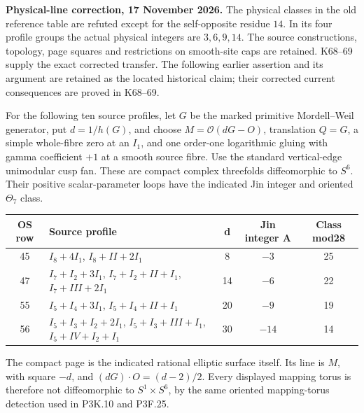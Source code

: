 \begin{theorem}\label{night:P3K.22}
\par\noindent\textbf{Physical-line correction, 17 November 2026.} The physical classes in the old reference table are refuted except for the self-opposite residue \(14\). In its four profile groups the actual physical integers are \(3,6,9,14\). The source constructions, topology, page squares and restrictions on smooth-site caps are retained. K68--69 supply the exact corrected transfer. The following earlier assertion and its argument are retained as the located historical claim; their corrected current consequences are proved in K68--69.\medskip\par 
For the following ten source profiles, let \(G\) be the marked
primitive Mordell--Weil generator, put \(d=1/h(G)\), and choose
\(M=\mathcal O(dG-O)\), translation \(Q=G\), a simple whole-fibre
zero at an \(I_1\), and one order-one logarithmic gluing with gamma
coefficient \(+1\) at a smooth source fibre.  Use the standard
vertical-edge unimodular cusp fan.  These are compact complex
threefolds diffeomorphic to \(S^6\).  Their positive scalar-parameter
loops have the indicated Jin integer and oriented \(\Theta_7\) class.


\begin{center}\small\begin{tabular}{c p{} c c c}\hline
OS row & Source profile & d & Jin integer A & Class mod28 \\
\hline
45 & \(I_8+4I_1\), \(I_8+II+2I_1\) & 8 & \(-3\) & 25 \\
47 & \(I_7+I_2+3I_1\), \(I_7+I_2+II+I_1\), \(I_7+III+2I_1\) & 14 & \(-6\) & 22 \\
55 & \(I_5+I_4+3I_1\), \(I_5+I_4+II+I_1\) & 20 & \(-9\) & 19 \\
56 & \(I_5+I_3+I_2+2I_1\), \(I_5+I_3+III+I_1\), \(I_5+IV+I_2+I_1\) & 30 & \(-14\) & 14 \\
\hline\end{tabular}\end{center}

The compact page is the indicated rational elliptic surface itself.
Its line is \(M\), with square \(-d\), and
\((dG)\cdot O=(d-2)/2\).  Every displayed mapping torus is therefore
not diffeomorphic to \(S^1\times S^6\), by the same oriented
mapping-torus detection used in P3K.10 and P3F.25.


\end{theorem}

